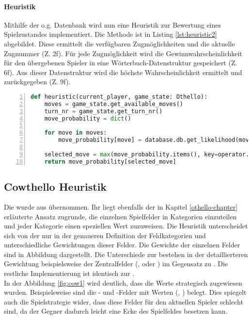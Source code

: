 \paragraph{Heuristik}
\label{para:heuristic1}
Mithilfe der o.g. Datenbank wird  nun eine Heuristik zur Bewertung eines Spielzustandes implementiert. Die Methode  ist in Listing \ref{lst:heuristic2} abgebildet. Diese ermittelt die verfügbaren Zugmöglichkeiten und die aktuelle Zugnummer (Z. 2f). Für jede Zugmöglichkeit wird die Gewinnwahrscheinlichkeit für den übergebenen Spieler in eine Wörterbuch-Datenstruktur gespeichert (Z. 6f). Aus dieser Datenstruktur wird die höchste Wahrscheinlichkeit ermittelt und zurückgegeben (Z. 9f).
\begin{lstlisting}[basicstyle=\footnotesize, caption = {Stored Monte-Carlo-Heuristik Funktion}, language = python, captionpos = t , numbers=left, label={lst:heuristic2}]
def heuristic(current_player, game_state: Othello):
	moves = game_state.get_available_moves()
	turn_nr = game_state.get_turn_nr()
	move_probability = dict()

	for move in moves:
		move_probability[move] = database.db.get_likelihood(move, turn_nr, current_player)

	selected_move = max(move_probability.items(), key=operator.itemgetter(1))[0]
 	return move_probability[selected_move]
\end{lstlisting}

\subsection{Cowthello Heuristik}
Die  wurde aus \cite{cow1} übernommen. Ihr liegt ebenfalls der in Kapitel \ref{othello-chapter} erläuterte Ansatz zugrunde, die einzelnen Spielfelder in Kategorien einzuteilen und jeder Kategorie einen speziellen Wert zuzuweisen. Die Heuristik unterscheidet sich von der  nur in der genaueren Definition der Feldkategorien und unterschiedliche Gewichtungen dieser Felder.
Die Gewichte der einzelnen Felder sind in Abbildung dargestellt. Die Unterschiede zur  bestehen in der detaillierteren Gewichtung beispielsweise der Zentralfelder (,  oder ) im Gegensatz zu . Die restliche Implementierung ist identisch zur .
\\
In der Abbildung \ref{fig:cow1} wird deutlich, dass die Werte strategisch zugewiesen wurden. Beispielsweise sind die - und -Felder mit  Werten (, ) belegt. Dies spiegelt auch die Spielstrategie wider, dass diese Felder für den aktuellen Spieler schlecht sind, da der Gegner dadurch leicht eine Ecke des Spielfeldes besetzen kann.

